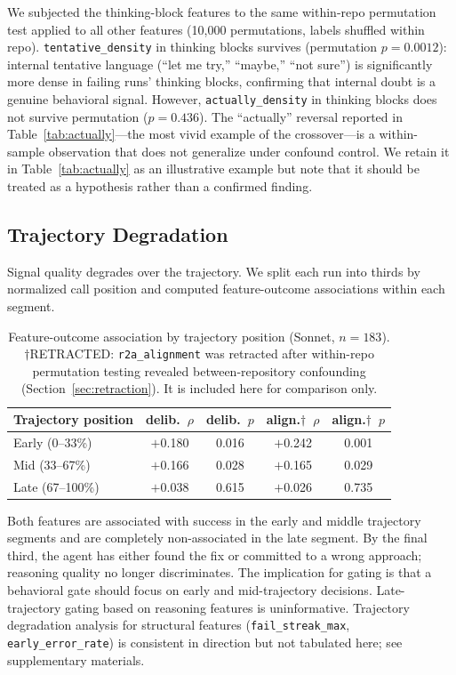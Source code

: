 \documentclass[11pt]{article}
\newcommand{\feat}[1]{\texttt{#1}}
\newcommand{\rtalign}{\feat{r2a\_alignment}}
\begin{document}
We subjected the thinking-block features to the same within-repo permutation test applied to all other features (10,000 permutations, labels shuffled within repo).
\feat{tentative\_density} in thinking blocks survives (permutation $p = 0.0012$): internal tentative language (``let me try,'' ``maybe,'' ``not sure'') is significantly more dense in failing runs' thinking blocks, confirming that internal doubt is a genuine behavioral signal.
However, \feat{actually\_density} in thinking blocks does not survive permutation ($p = 0.436$).
The ``actually'' reversal reported in Table~\ref{tab:actually}---the most vivid example of the crossover---is a within-sample observation that does not generalize under confound control.
We retain it in Table~\ref{tab:actually} as an illustrative example but note that it should be treated as a hypothesis rather than a confirmed finding.


\subsection{Trajectory Degradation}
\label{sec:degradation}

Signal quality degrades over the trajectory.
We split each run into thirds by normalized call position and computed feature-outcome associations within each segment.

\begin{table}[t]
\centering
\caption{Feature-outcome association by trajectory position (Sonnet, $n = 183$). $\dagger$RETRACTED: \rtalign{} was retracted after within-repo permutation testing revealed between-repository confounding (Section~\ref{sec:retraction}). It is included here for comparison only.}
\label{tab:degradation}
\small
\begin{tabular}{lcccc}
\toprule
\textbf{Trajectory position} & \textbf{delib.\ $\rho$} & \textbf{delib.\ $p$} & \textbf{align.$\dagger$\ $\rho$} & \textbf{align.$\dagger$\ $p$} \\
\midrule
Early (0--33\%)  & $+$0.180 & 0.016 & $+$0.242 & 0.001 \\
Mid (33--67\%)   & $+$0.166 & 0.028 & $+$0.165 & 0.029 \\
Late (67--100\%) & $+$0.038 & 0.615 & $+$0.026 & 0.735 \\
\bottomrule
\end{tabular}
\end{table}

Both features are associated with success in the early and middle trajectory segments and are completely non-associated in the late segment.
By the final third, the agent has either found the fix or committed to a wrong approach; reasoning quality no longer discriminates.
The implication for gating is that a behavioral gate should focus on early and mid-trajectory decisions.
Late-trajectory gating based on reasoning features is uninformative.
Trajectory degradation analysis for structural features (\feat{fail\_streak\_max}, \feat{early\_error\_rate}) is consistent in direction but not tabulated here; see supplementary materials.
\end{document}
